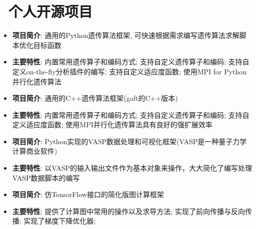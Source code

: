 \documentclass{resume}
\begin{document}
\section{\faUser\ 个人开源项目}

\begin{onehalfspacing}
\begin{itemize}
    \item \textbf{项目简介}: 通用的Python遗传算法框架, 可快速根据需求编写遗传算法求解脚本优化目标函数
    \item \textbf{主要特性}: 内置常用遗传算子和编码方式; 支持自定义遗传算子和编码; 支持自定义on-the-fly分析插件的编写; 支持自定义适应度函数; 使用MPI for Python并行化遗传算法
\end{itemize}
\end{onehalfspacing}

\begin{onehalfspacing}
\begin{itemize}
    \item \textbf{项目简介}: 通用的C++遗传算法框架(gaft的C++版本)
    \item \textbf{主要特性}: 内置常用遗传算子和编码方式; 支持自定义遗传算子和编码; 支持自定义适应度函数; 使用MPI并行化遗传算法具有良好的强扩展效率
\end{itemize}
\end{onehalfspacing}

\begin{onehalfspacing}
\begin{itemize}
    \item \textbf{项目简介}: Python实现的VASP数据处理和可视化框架(VASP是一种量子力学计算商业软件)
    \item \textbf{主要特性}: 以VASP的输入输出文件作为基本对象来操作，大大简化了编写处理VASP数据脚本的编写
\end{itemize}
\end{onehalfspacing}

\begin{onehalfspacing}
\begin{itemize}
    \item \textbf{项目简介}: 仿TensorFlow接口的简化版图计算框架
    \item \textbf{主要特性}: 提供了计算图中常用的操作以及求导方法; 实现了前向传播与反向传播; 实现了梯度下降优化器;
\end{itemize}
\end{onehalfspacing}
\end{document}
